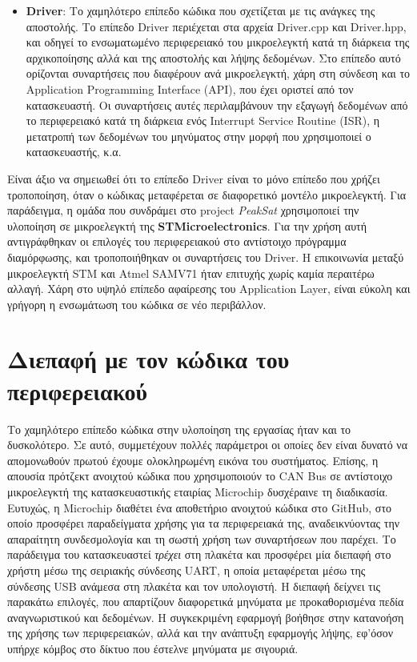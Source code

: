 \documentclass[a4paper,nobib,justified]{tufte-book}
\begin{document}
\begin{itemize}
	\item \textbf{Driver}: Το χαμηλότερο επίπεδο κώδικα που σχετίζεται με τις ανάγκες της αποστολής. Το επίπεδο Driver περιέχεται στα αρχεία Driver.cpp και Driver.hpp, και οδηγεί το ενσωματωμένο περιφερειακό του μικροελεγκτή κατά τη διάρκεια της αρχικοποίησης αλλά και της αποστολής και λήψης δεδομένων. Στο επίπεδο αυτό ορίζονται συναρτήσεις που διαφέρουν ανά μικροελεγκτή, χάρη στη σύνδεση και το Application Programming Interface (API), που έχει οριστεί από τον κατασκευαστή. Οι συναρτήσεις αυτές περιλαμβάνουν την εξαγωγή δεδομένων από το περιφερειακό κατά τη διάρκεια ενός Interrupt Service Routine (ISR), η μετατροπή των δεδομένων του μηνύματος στην μορφή που χρησιμοποιεί ο κατασκευαστής, κ.α.
\end{itemize}

Είναι άξιο να σημειωθεί ότι το επίπεδο Driver είναι το μόνο επίπεδο που χρήζει τροποποίηση, όταν ο κώδικας μεταφέρεται σε διαφορετικό μοντέλο μικροελεγκτή. Για παράδειγμα, η ομάδα που συνδράμει στο project \textit{PeakSat} χρησιμοποιεί την υλοποίηση σε μικροελεγκτή της \textbf{STMicroelectronics}. Για την χρήση αυτή αντιγράφθηκαν οι επιλογές του περιφερειακού στο αντίστοιχο πρόγραμμα διαμόρφωσης, και τροποποιήθηκαν οι συναρτήσεις του Driver. Η επικοινωνία μεταξύ μικροελεγκτή STM και Atmel SAMV71 ήταν επιτυχής χωρίς καμία περαιτέρω αλλαγή. Χάρη στο υψηλό επίπεδο αφαίρεσης του Application Layer, είναι εύκολη και γρήγορη η ενσωμάτωση του κώδικα σε νέο περιβάλλον.

\section{Διεπαφή με τον κώδικα του περιφερειακού}
Το χαμηλότερο επίπεδο κώδικα στην υλοποίηση της εργασίας ήταν και το δυσκολότερο. Σε αυτό, συμμετέχουν πολλές παράμετροι οι οποίες δεν είναι δυνατό να απομονωθούν πρωτού έχουμε ολοκληρωμένη εικόνα του συστήματος. Επίσης, η απουσία πρότζεκτ ανοιχτού κώδικα που χρησιμοποιούν το CAN Bus σε αντίστοιχο μικροελεγκτή της κατασκευαστικής εταιρίας Microchip δυσχέραινε τη διαδικασία. Ευτυχώς, η Microchip διαθέτει ένα αποθετήριο ανοιχτού κώδικα στο GitHub, στο οποίο προσφέρει παραδείγματα χρήσης για τα περιφερειακά της, αναδεικνύοντας την απαραίτητη συνδεσμολογία και τη σωστή χρήση των συναρτήσεων που παρέχει. Το παράδειγμα του κατασκευαστεί \textit{τρέχει} στη πλακέτα και προσφέρει μία διεπαφή στο χρήστη μέσω της σειριακής σύνδεσης UART, η οποία μεταφέρεται μέσω της σύνδεσης USB ανάμεσα στη πλακέτα και τον υπολογιστή. Η διεπαφή δείχνει τις παρακάτω επιλογές, που απαρτίζουν διαφορετικά μηνύματα με προκαθορισμένα πεδία αναγνωριστικού και δεδομένων. Η συγκεκριμένη εφαρμογή βοήθησε στην κατανοήση της χρήσης των περιφερειακών, αλλά και την ανάπτυξη εφαρμογής λήψης, εφ'όσον υπήρχε κόμβος στο δίκτυο που έστελνε μηνύματα με σιγουριά.
\end{document}
